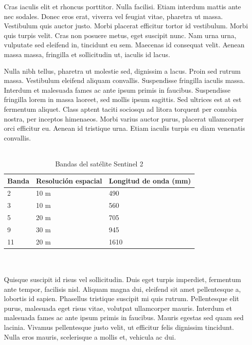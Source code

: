 \documentclass[a4paper,11pt]{article}
\begin{document}
Cras iaculis elit et rhoncus porttitor. Nulla facilisi. Etiam interdum mattis ante nec sodales. Donec eros erat, viverra vel feugiat vitae, pharetra ut massa. Vestibulum quis auctor justo. Morbi placerat efficitur tortor id vestibulum. Morbi quis turpis velit. Cras non posuere metus, eget suscipit nunc. Nam urna urna, vulputate sed eleifend in, tincidunt eu sem. Maecenas id consequat velit. Aenean massa massa, fringilla et sollicitudin ut, iaculis id lacus.

Nulla nibh tellus, pharetra ut molestie sed, dignissim a lacus. Proin sed rutrum massa. Vestibulum eleifend aliquam convallis. Suspendisse fringilla iaculis massa. Interdum et malesuada fames ac ante ipsum primis in faucibus. Suspendisse fringilla lorem in massa laoreet, sed mollis ipsum sagittis. Sed ultrices est at est fermentum aliquet. Class aptent taciti sociosqu ad litora torquent per conubia nostra, per inceptos himenaeos. Morbi varius auctor purus, placerat ullamcorper orci efficitur eu. Aenean id tristique urna. Etiam iaculis turpis eu diam venenatis convallis.\\\\

\begin{table}[htb]
	\begin{center}
		\begin{tabular}{|l|l|l|}
			\hline
			Banda & Resolución espacial & Longitud de onda (mm) \\
			\hline \hline
			2 & 10 m & 490 \\ \hline
			3 & 10 m & 560 \\ \hline
			5 & 20 m & 705 \\ \hline
			9 & 30 m & 945 \\ \hline
			11 & 20 m & 1610 \\ \hline
		\end{tabular}
		\caption{Bandas del satélite Sentinel 2}
	\end{center}
\end{table}
\\\\

Quisque suscipit id risus vel sollicitudin. Duis eget turpis imperdiet, fermentum ante tempor, facilisis nisl. Aliquam magna dui, eleifend sit amet pellentesque a, lobortis id sapien. Phasellus tristique suscipit mi quis rutrum. Pellentesque elit purus, malesuada eget risus vitae, volutpat ullamcorper mauris. Interdum et malesuada fames ac ante ipsum primis in faucibus. Mauris egestas sed quam sed lacinia. Vivamus pellentesque justo velit, ut efficitur felis dignissim tincidunt. Nulla eros mauris, scelerisque a mollis et, vehicula ac dui.
\end{document}
